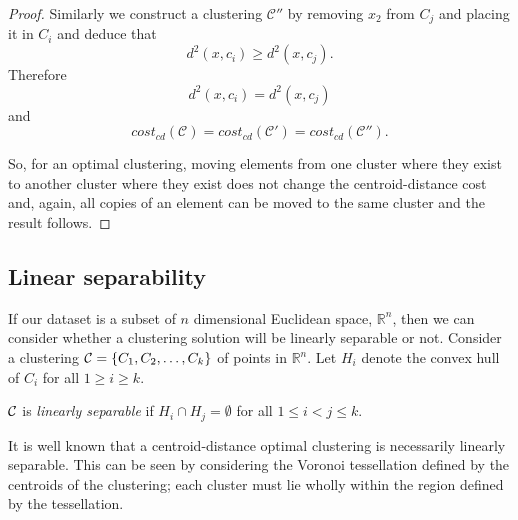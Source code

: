 \begin{proof}
  Similarly we construct a clustering $\mathcal{C}''$ by removing $x_2$ from
  $C_{j}$ and placing it in $C_{i}$ and deduce that
  \begin{equation*}
    d^2(x,c_{i}) \geq d^2(x,c_{j}).
  \end{equation*}
  Therefore
  \begin{equation*}
    d^2(x,c_{i}) = d^2(x,c_{j})
  \end{equation*}
  and
  \begin{equation*}
    cost_{cd}(\mathcal{C}) = cost_{cd}(\mathcal{C}') = cost_{cd}(\mathcal{C}'').
  \end{equation*}
  
  So, for an optimal clustering, moving elements from one cluster where they
  exist to another cluster where they exist does not change the
  centroid-distance cost and, again, all copies of an element can be moved to
  the same cluster and the result follows.
\end{proof}

\subsection{Linear separability}
\label{sec:linear-separability}

If our dataset is a subset of $n$ dimensional Euclidean space, $\mathbb{R}^n$,
then we can consider whether a clustering solution will be linearly separable
or not.  Consider a clustering $\mathcal{C} = \{C_1,C_2,\dotsc,C_k\}$ of points in
$\mathbb{R}^n$.  Let $H_i$ denote the convex hull of $C_i$ for all $1 \geq i
\geq k$.

\begin{dfn}
  $\mathcal{C}$ is \textit{linearly separable} if $H_i \cap H_j = \emptyset$ for all
  $1 \leq i < j \leq k$.
\end{dfn}

It is well known that a centroid-distance optimal clustering is necessarily
linearly separable.  This can be seen by considering the Voronoi tessellation
defined by the centroids of the clustering; each cluster must lie wholly
within the region defined by the tessellation.

